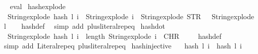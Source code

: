 \begin{isabellebody}
\isadelimproof
\ %
\endisadelimproof
%
\isatagproof
{}\isamarkupfalse%
\ eval%
\endisatagproof
{\isafoldproof}%
%
\isadelimproof
%
\endisadelimproof
\isanewline
\isanewline
{}\isamarkupfalse%
\ hash{\isacharunderscore}{\kern0pt}explode{\isacharcolon}{\kern0pt}\isanewline
\ \ {\isachardoublequoteopen}String{\isachardot}{\kern0pt}explode\ {\isacharparenleft}{\kern0pt}hash\ l\ i{\isacharparenright}{\kern0pt}\ {\isacharequal}{\kern0pt}\ String{\isachardot}{\kern0pt}explode\ i\ {\isacharat}{\kern0pt}\ {\isacharparenleft}{\kern0pt}String{\isachardot}{\kern0pt}explode\ {\isacharparenleft}{\kern0pt}STR\ {\isacharprime}{\kern0pt}{\isacharprime}{\kern0pt}{\isachardot}{\kern0pt}{\isacharprime}{\kern0pt}{\isacharprime}{\kern0pt}{\isacharparenright}{\kern0pt}\ {\isacharat}{\kern0pt}\ String{\isachardot}{\kern0pt}explode\ l{\isacharparenright}{\kern0pt}{\isachardoublequoteclose}\isanewline
%
\isadelimproof
\ \ %
\endisadelimproof
%
\isatagproof
{}\isamarkupfalse%
\ hash{\isacharunderscore}{\kern0pt}def\ \isamarkupfalse%
\ {\isacharparenleft}{\kern0pt}simp\ add{\isacharcolon}{\kern0pt}\ plus{\isacharunderscore}{\kern0pt}literal{\isachardot}{\kern0pt}rep{\isacharunderscore}{\kern0pt}eq{\isacharparenright}{\kern0pt}%
\endisatagproof
{\isafoldproof}%
%
\isadelimproof
\isanewline
%
\endisadelimproof
\isanewline
{}\isamarkupfalse%
\ hash{\isacharunderscore}{\kern0pt}dot{\isacharcolon}{\kern0pt}\isanewline
\ \ {\isachardoublequoteopen}String{\isachardot}{\kern0pt}explode\ {\isacharparenleft}{\kern0pt}hash\ l\ i{\isacharparenright}{\kern0pt}\ {\isacharbang}{\kern0pt}\ length\ {\isacharparenleft}{\kern0pt}String{\isachardot}{\kern0pt}explode\ i{\isacharparenright}{\kern0pt}\ {\isacharequal}{\kern0pt}\ CHR\ {\isacharprime}{\kern0pt}{\isacharprime}{\kern0pt}{\isachardot}{\kern0pt}{\isacharprime}{\kern0pt}{\isacharprime}{\kern0pt}{\isachardoublequoteclose}\isanewline
%
\isadelimproof
\ \ %
\endisadelimproof
%
\isatagproof
{}\isamarkupfalse%
\ hash{\isacharunderscore}{\kern0pt}def\ \isamarkupfalse%
\ {\isacharparenleft}{\kern0pt}simp\ add{\isacharcolon}{\kern0pt}\ Literal{\isachardot}{\kern0pt}rep{\isacharunderscore}{\kern0pt}eq\ plus{\isacharunderscore}{\kern0pt}literal{\isachardot}{\kern0pt}rep{\isacharunderscore}{\kern0pt}eq{\isacharparenright}{\kern0pt}%
\endisatagproof
{\isafoldproof}%
%
\isadelimproof
\isanewline
%
\endisadelimproof
\isanewline
{}\isamarkupfalse%
\ hash{\isacharunderscore}{\kern0pt}injective{\isacharcolon}{\kern0pt}\isanewline
\ \ \ {\isachardoublequoteopen}hash\ l\ i\ {\isacharequal}{\kern0pt}\ hash\ l{\isacharprime}{\kern0pt}\ i{\isacharprime}{\kern0pt}{\isachardoublequoteclose}\isanewline

\end{isabellebody}
